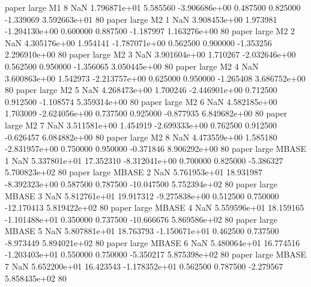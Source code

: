             paper      large       M1                 8                  NaN 1.796871e+01      5.585560 -3.906686e+00 0.487500 0.825000      -1.339069 3.592663e+01 80
            paper      large       M2                 1                  NaN 3.908453e+00      1.973981 -1.204130e+00 0.600000 0.887500      -1.187997 1.163276e+00 80
            paper      large       M2                 2                  NaN 4.305176e+00      1.954141 -1.787071e+00 0.562500 0.900000      -1.353256 2.296910e+00 80
            paper      large       M2                 3                  NaN 3.901604e+00      1.710267 -2.032646e+00 0.562500 0.950000      -1.356065 3.050445e+00 80
            paper      large       M2                 4                  NaN 3.600863e+00      1.542973 -2.213757e+00 0.625000 0.950000      -1.265408 3.686752e+00 80
            paper      large       M2                 5                  NaN 4.268473e+00      1.700246 -2.446901e+00 0.712500 0.912500      -1.108574 5.359314e+00 80
            paper      large       M2                 6                  NaN 4.582185e+00      1.703009 -2.624056e+00 0.737500 0.925000      -0.877935 6.849682e+00 80
            paper      large       M2                 7                  NaN 3.511581e+00      1.454919 -2.699333e+00 0.762500 0.912500      -0.626457 6.084882e+00 80
            paper      large       M2                 8                  NaN 4.473559e+00      1.585180 -2.831957e+00 0.750000 0.950000      -0.371846 8.906292e+00 80
            paper      large    MBASE                 1                  NaN 5.337801e+01     17.352310 -8.312041e+00 0.700000 0.825000      -5.386327 5.700823e+02 80
            paper      large    MBASE                 2                  NaN 5.761953e+01     18.931987 -8.392323e+00 0.587500 0.787500     -10.047500 5.752394e+02 80
            paper      large    MBASE                 3                  NaN 5.812761e+01     19.917312 -9.275838e+00 0.512500 0.750000     -12.170413 5.819422e+02 80
            paper      large    MBASE                 4                  NaN 5.559596e+01     18.159165 -1.101488e+01 0.350000 0.737500     -10.666676 5.869586e+02 80
            paper      large    MBASE                 5                  NaN 5.807881e+01     18.763793 -1.150671e+01 0.462500 0.737500      -8.973449 5.894021e+02 80
            paper      large    MBASE                 6                  NaN 5.480064e+01     16.774516 -1.203403e+01 0.550000 0.750000      -5.350217 5.875398e+02 80
            paper      large    MBASE                 7                  NaN 5.652200e+01     16.423543 -1.178352e+01 0.562500 0.787500      -2.279567 5.858435e+02 80
